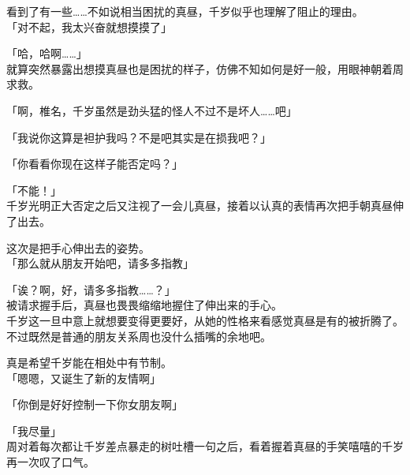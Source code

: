 看到了有一些……不如说相当困扰的真昼，千岁似乎也理解了阻止的理由。\\

「对不起，我太兴奋就想摸摸了」

「哈，哈啊……」\\

就算突然暴露出想摸真昼也是困扰的样子，仿佛不知如何是好一般，用眼神朝着周求救。

「啊，椎名，千岁虽然是劲头猛的怪人不过不是坏人……吧」

「我说你这算是袒护我吗？不是吧其实是在损我吧？」

「你看看你现在这样子能否定吗？」

「不能！」\\

千岁光明正大否定之后又注视了一会儿真昼，接着以认真的表情再次把手朝真昼伸了出去。

这次是把手心伸出去的姿势。\\

「那么就从朋友开始吧，请多多指教」

「诶？啊，好，请多多指教……？」\\

被请求握手后，真昼也畏畏缩缩地握住了伸出来的手心。\\

千岁这一旦中意上就想要变得更要好，从她的性格来看感觉真昼是有的被折腾了。不过既然是普通的朋友关系周也没什么插嘴的余地吧。

真是希望千岁能在相处中有节制。\\

「嗯嗯，又诞生了新的友情啊」

「你倒是好好控制一下你女朋友啊」

「我尽量」\\

周对着每次都让千岁差点暴走的树吐槽一句之后，看着握着真昼的手笑嘻嘻的千岁再一次叹了口气。\\
